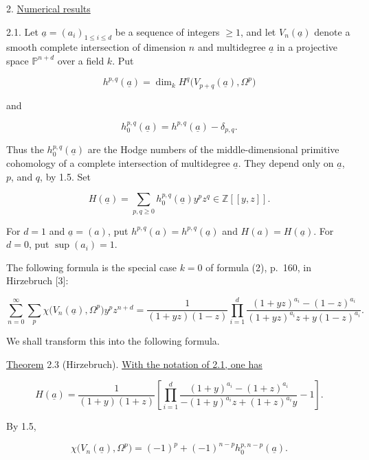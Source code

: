 2. \underline{Numerical results}

2.1. Let $\underline a=(a_i)_{1\leq i\leq d}$ be a sequence of integers
$\geq1$, and let $V_n(\underline a)$ denote a smooth complete intersection
of dimension $n$ and multidegree $\underline a$ in a projective space
$\mathbb P^{n+d}$ over a field $k$.  Put

\begin{equation*}
h^{p,q}(\underline a)
=\dim_k H^q\bigl(V_{p+q}(\underline a),\Omega^p\bigr)
\end{equation*}

and

\begin{equation*}
h_0^{p,q}(\underline a)=h^{p,q}(\underline a)-\delta_{p,q}.
\end{equation*}

Thus the $h_0^{p,q}(\underline a)$ are the Hodge numbers of the
middle-dimensional primitive cohomology of a complete intersection of
multidegree $\underline a$.  They depend only on $\underline a$, $p$, and
$q$, by 1.5.  Set

\begin{equation}\tag{2.1.1}
H(\underline a)=\sum_{p,q\geq0}h_0^{p,q}(\underline a)y^pz^q
\in\mathbb Z[[y,z]].
\end{equation}

For $d=1$ and $\underline a=(a)$, put
$h^{p,q}(a)=h^{p,q}(\underline a)$ and $H(a)=H(\underline a)$.  For $d=0$,
put $\sup(a_i)=1$.

The following formula is the special case $k=0$ of formula (2), p.~160,
in Hirzebruch [3]:


\begin{equation}\tag{2.2}
\sum_{n=0}^{\infty}\sum_p
\chi\bigl(V_n(\underline a),\Omega^p\bigr)y^pz^{n+d}
=\frac{1}{(1+yz)(1-z)}
\prod_{i=1}^d
\frac{(1+yz)^{a_i}-(1-z)^{a_i}}
{(1+yz)^{a_i}z+y(1-z)^{a_i}}.
\end{equation}

We shall transform this into the following formula.

\underline{Theorem} 2.3 (Hirzebruch). \underline{With the notation of 2.1,
one has}

\begin{equation*}
H(\underline a)=\frac{1}{(1+y)(1+z)}\left[
\prod_{i=1}^d
\frac{(1+y)^{a_i}-(1+z)^{a_i}}
{-(1+y)^{a_i}z+(1+z)^{a_i}y}-1\right].
\end{equation*}

By 1.5,

\begin{equation*}
\chi\bigl(V_n(\underline a),\Omega^p\bigr)
=(-1)^p+(-1)^{n-p}h_0^{p,n-p}(\underline a).
\end{equation*}

